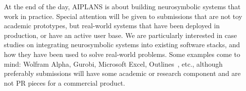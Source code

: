 \documentclass{article}
\begin{document}
    At the end of the day, AIPLANS is about building neurosymbolic systems that work in practice. Special attention will be given to submissions that are not toy academic prototypes, but real-world systems that have been deployed in production, or have an active user base. We are particularly interested in case studies on integrating neurosymbolic systems into existing software stacks, and how they have been used to solve real-world problems. Some examples come to mind: Wolfram Alpha, Gurobi, Microsoft Excel, Outlines~\cite{willard2023efficient}, etc., although preferably submissions will have some academic or research component and are not PR pieces for a commercial product.
    \clearpage






\end{document}
